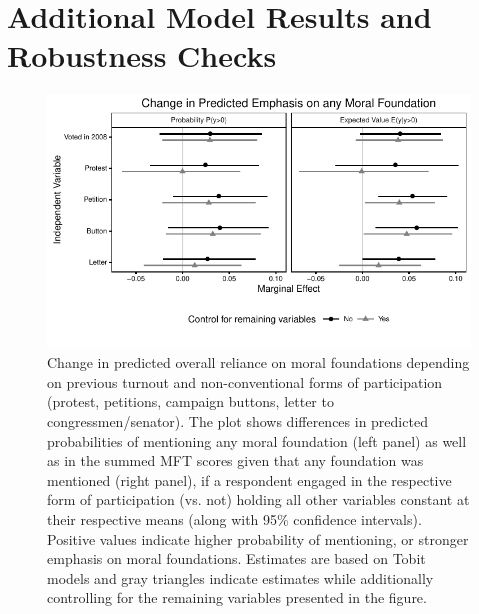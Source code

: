 \documentclass[12pt]{article}
\begin{document}


\clearpage
\section{Additional Model Results and Robustness Checks}\label{app:robust}
\renewcommand\thefigure{\thesection.\arabic{figure}}
\renewcommand\thetable{\thesection.\arabic{table}}
\setcounter{figure}{0}
\setcounter{table}{0}


\begin{figure}[h]\centering
\includegraphics{../calc/fig/tobit_learn_participation.pdf}
\caption{Change in predicted overall reliance on moral foundations depending on previous turnout and non-conventional forms of participation (protest, petitions, campaign buttons, letter to congressmen/senator). The plot shows differences in predicted probabilities of mentioning any moral foundation (left panel) as well as in the summed MFT scores given that any foundation was mentioned (right panel), if a respondent engaged in the respective form of participation (vs. not) holding all other variables constant at their respective means (along with 95\% confidence intervals). Positive values indicate higher probability of mentioning, or stronger emphasis on moral foundations. Estimates are based on Tobit models and gray triangles indicate estimates while additionally controlling for the remaining variables presented in the figure. %
}\label{fig:tobit_learn_participation}
\end{figure}
\end{document}
